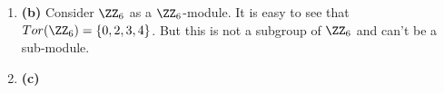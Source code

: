 \begin{enumerate}[label=]
    \item 
        \textbf{(b)} Consider $\ZZ_6$ as a $\ZZ_6$-module. It is easy to see that $Tor(\ZZ_6) = \{0, 2, 3, 4\}$. But this is not a subgroup of $\ZZ_6$ and can't be a sub-module.


    \item
        \textbf{(c)} 
\end{enumerate}